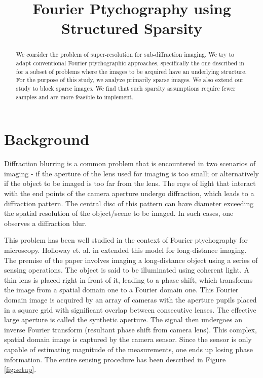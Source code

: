 \documentclass{article} %
\begin{document}
\renewcommand{\baselinestretch}{1}
\title{Fourier Ptychography using Structured Sparsity}

\date{}

\maketitle

\begin{abstract}

We consider the problem of super-resolution for sub-diffraction imaging. We try to adapt conventional Fourier ptychographic approaches, specifically the one described in \cite{holloway2016toward} for a subset of problems where the images to be acquired have an underlying structure. For the purpose of this study, we analyze primarily sparse images. We also extend our study to block sparse images. We find that such sparsity assumptions require fewer samples and are more feasible to implement.
\end{abstract}

\section{Background}

Diffraction blurring is a common problem that is encountered in two scenarios of imaging - if the aperture of the lens used for imaging is too small; or alternatively if the object to be imaged is too far from the lens. The rays of light that interact with the end points of the camera aperture undergo diffraction, which leads to a diffraction pattern. The central disc of this pattern can have diameter exceeding the spatial resolution of the object/scene to be imaged. In such cases, one observes a diffraction blur. 

This problem has been well studied in the context of Fourier ptychography for microscopy. Holloway et. al. in \cite{holloway2016toward} extended this model for long-distance imaging. The premise of the paper involves imaging a long-distance object using a series of sensing operations. The object is said to be illuminated using coherent light. A thin lens is placed right in front of it, leading to a phase shift, which transforms the image from a spatial domain one to a Fourier domain one. This Fourier domain image is acquired by an array of cameras with the aperture pupils placed in a square grid with significant overlap between consecutive lenses. The effective large aperture is called the synthetic aperture. The signal then undergoes an inverse Fourier transform (resultant phase shift from camera lens). This complex, spatial domain image is captured by the camera sensor. Since the sensor is only capable of estimating magnitude of the measurements, one ends up losing phase information. The entire sensing procedure has been described in Figure \ref{fig:setup}.
\end{document}
